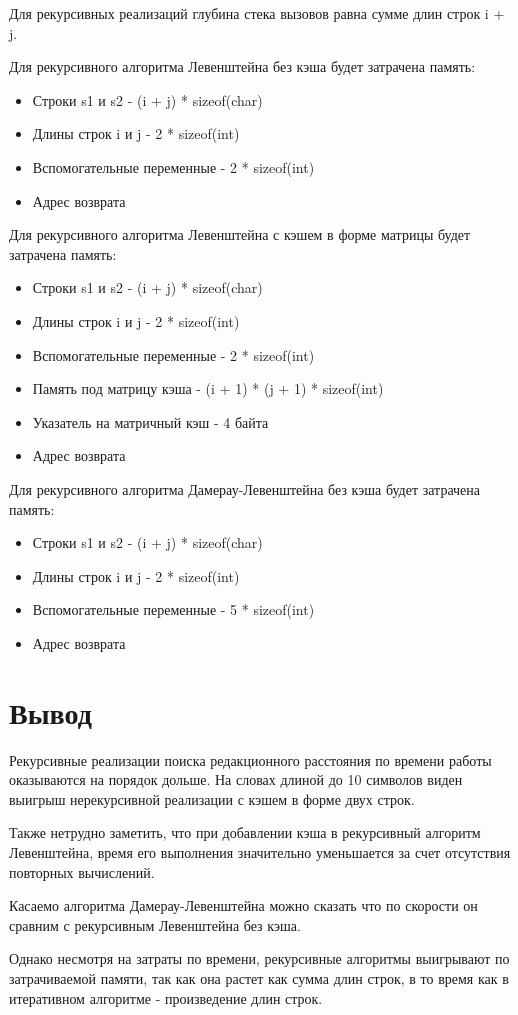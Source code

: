 Для рекурсивных реализаций глубина стека вызовов равна сумме длин строк i + j.

Для рекурсивного алгоритма Левенштейна без кэша будет затрачена память:

\begin{itemize}
	\item Строки s1 и s2 - (i + j) * sizeof(char)
	\item Длины строк i и j - 2 * sizeof(int)
	\item Вспомогательные переменные - 2 * sizeof(int)
	\item Адрес возврата
\end{itemize}

Для рекурсивного алгоритма Левенштейна с кэшем в форме матрицы будет затрачена память:

\begin{itemize}
	\item Строки s1 и s2 - (i + j) * sizeof(char)
	\item Длины строк i и j - 2 * sizeof(int)
	\item Вспомогательные переменные - 2 * sizeof(int)
	\item Память под матрицу кэша - (i + 1) * (j + 1) * sizeof(int)
	\item Указатель на матричный кэш - 4 байта
	\item Адрес возврата
\end{itemize}

Для рекурсивного алгоритма Дамерау-Левенштейна без кэша будет затрачена память:

\begin{itemize}
	\item Строки s1 и s2 - (i + j) * sizeof(char)
	\item Длины строк i и j - 2 * sizeof(int)
	\item Вспомогательные переменные - 5 * sizeof(int)
	\item Адрес возврата
\end{itemize}

\section{Вывод}

Рекурсивные реализации поиска редакционного расстояния по времени работы оказываются на порядок дольше. На словах длиной до 10 символов виден выигрыш нерекурсивной реализации с кэшем в форме двух строк.

Также нетрудно заметить, что при добавлении кэша в рекурсивный алгоритм Левенштейна, время его выполнения значительно уменьшается за счет отсутствия повторных вычислений.

Касаемо алгоритма Дамерау-Левенштейна можно сказать что по скорости он сравним с рекурсивным Левенштейна без кэша.

Однако несмотря на затраты по времени, рекурсивные алгоритмы выигрывают по затрачиваемой памяти, так как она растет как сумма длин строк, в то время как в итеративном алгоритме - произведение длин строк.